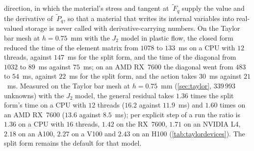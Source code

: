 \documentclass{article}
\newcommand{\F}{~F}
\renewcommand{\P}{~P}
\theoremstyle{definition}
\theoremstyle{plain}
\begin{document}
direction, in which the material's stress and tangent at $\tilde{\F}_q$
supply the value and the derivative of $\tilde{\P}_q$, so that a material
that writes its internal variables into real-valued storage is never
called with derivative-carrying numbers. On the Taylor bar mesh at $h =
0.75$~mm with the $J_2$ model in plastic flow, the closed form reduced the
time of the element matrix from $1078$ to $133$~ms on a CPU with $12$
threads, against $147$~ms for the split form, and the time of the diagonal
from $1032$ to $89$~ms against $75$~ms; on an AMD RX~7600 the diagonal
went from $483$ to $54$~ms, against $22$~ms for the split form, and the
action takes $30$~ms against $21$~ms. Measured on the Taylor bar mesh at $h = 0.75$~mm
(\cref{sec:taylor}, $339\,993$ unknowns) with the $J_2$ model, the general
residual takes $1.36$ times the split form's time on a CPU with $12$
threads ($16.2$ against $11.9$~ms) and $1.60$ times on an AMD RX~7600
($13.6$ against $8.5$~ms); per explicit step of a run the ratio is $1.36$
on a CPU with $16$ threads, $1.42$ on the RX~7600, $1.71$ on an NVIDIA L4,
$2.18$ on an A100, $2.27$ on a V100 and $2.43$ on an H100
(\cref{tab:taylordevices}). The split form remains the default for
that model.
\end{document}
